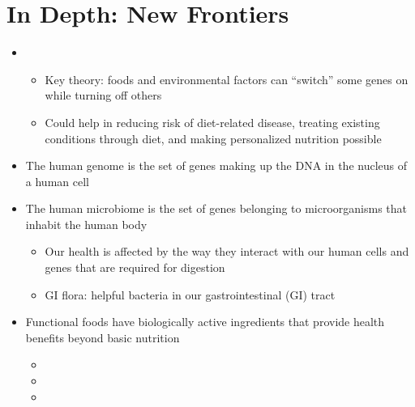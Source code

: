 \documentclass[title={Chapter 1}]{fdsn201notes}
\begin{document}
\section{In Depth: New Frontiers}\label{sec:in-depth:-new-frontiers}
\begin{itemize}
	\item {}
	\begin{itemize}
		\item Key theory: foods and environmental factors can ``switch'' some genes on while turning off others
		\item Could help in reducing risk of diet-related disease, treating existing conditions through diet, and making personalized nutrition possible
	\end{itemize}
	\item The human genome is the set of genes making up the DNA in the nucleus of a human cell
	\item The human microbiome is the set of genes belonging to microorganisms that inhabit the human body
	\begin{itemize}
		\item Our health is affected by the way they interact with our human cells and genes that are required for digestion
		\item GI flora: helpful bacteria in our gastrointestinal (GI) tract
	\end{itemize}
	\item Functional foods have biologically active ingredients that provide health benefits beyond basic nutrition
	\begin{itemize}
		\item {}
		\item {}
		\item {}
	\end{itemize}
\end{itemize}
\end{document}
